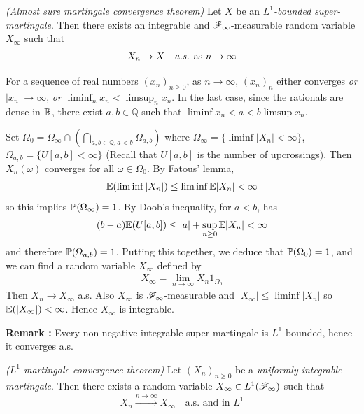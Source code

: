 \documentclass[12pt,a4paper]{report}
\newenvironment{proof}
{\begin{changemargin}{1cm}{0.5cm} 
	}%
	{\end{changemargin}
}
\begin{document}
\emph{(Almost sure martingale convergence theorem)} Let $X$ be an \emph{$L^1$-bounded super-martingale}. Then there exists an integrable and $\mathscr{F}_{\infty}$-measurable random variable $X_{\infty}$ such that
\begin{align*}
X_n \rightarrow X \quad \text{\emph{a.s.} as } n\rightarrow \infty
\end{align*}
\begin{proof}
\pf For a sequence of real numbers $(x_n)_{n\geq 0}$, as $n\rightarrow \infty$, $(x_n)_n$ either converges \emph{or} $|x_n|\rightarrow \infty$, \emph{or} $\liminf_{n} x_n < \limsup_{n} x_n$. In the last case, since the rationals are dense in $\mathbb{R}$, there exist $a,b\in \mathbb{Q}$ such that $\liminf x_n < a<b \limsup x_n$. 

\quad Set $\Omega_0 = \Omega_{\infty} \cap (\bigcap_{a,b\in \mathbb{Q},a<b} \Omega_{a,b})$ where $\Omega_{\infty} = \{ \liminf |X_n| <\infty \}$, $\Omega_{a,b} = \{ U[a,b] < \infty \}$ (Recall that $U[a,b]$ is the number of upcrossings). Then $X_n(\omega)$ converges for all $\omega \in \Omega_0$. By Fatous' lemma,
\begin{align*}
\mathbb{E}(\liminf |X_n|) \leq \liminf \mathbb{E} |X_n| <\infty
\end{align*}
so this implies $\mathbb{P} (\Omega_{\infty}) =1$. By Doob's inequality, for $a<b$, has
\begin{align*}
(b-a) \mathbb{E}(U[a,b]) \leq |a| + \sup_{n\geq 0} \mathbb{E} |X_n | <\infty
\end{align*}
and therefore $\mathbb{P}(\Omega_{a,b})=1$. Putting this together, we deduce that $\mathbb{P}(\Omega_0) =1$, and we can find a random variable $X_{\infty}$ defined by
\begin{align*}
X_{\infty} = \lim_{n\rightarrow \infty} X_n 1_{\Omega_0}
\end{align*}
Then $X_n\rightarrow X_{\infty}$ a.s. Also $X_{\infty}$ is $\mathscr{F}_{\infty}$-measurable and $|X_{\infty}| \leq \liminf|X_n|$ so $\mathbb{E}(|X_{\infty}|) <\infty$. Hence $X_{\infty}$ is integrable.

\eop
\end{proof}
\s

\textbf{Remark :} Every non-negative integrable super-martingale is $L^1$-bounded, hence it converges a.s.
\s

\emph{($L^1$ martingale convergence theorem)} Let $(X_n)_{n\geq 0}$ be a \emph{uniformly integrable martingale}. Then there exists a random variable $X_{\infty} \in L^1(\mathscr{F}_{\infty})$ such that
\begin{align*}
X_n \xrightarrow{n\rightarrow \infty} X_{\infty} \quad \text{a.s. and in }L^1
\end{align*}
\end{document}
